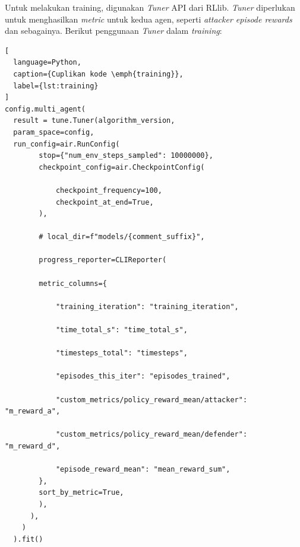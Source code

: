 Untuk melakukan training, digunakan \emph{Tuner} API dari RLlib.
\emph{Tuner} diperlukan untuk menghasilkan \emph{metric} untuk kedua agen,
seperti \emph{attacker episode rewards} dan sebagainya.
Berikut penggunaan \emph{Tuner} dalam \emph{training}:

\begin{lstlisting}[
  language=Python,
  caption={Cuplikan kode \emph{training}},
  label={lst:training}
]
config.multi_agent(
  result = tune.Tuner(algorithm_version,
  param_space=config,
  run_config=air.RunConfig(
        stop={"num_env_steps_sampled": 10000000},
        checkpoint_config=air.CheckpointConfig(

            checkpoint_frequency=100,
            checkpoint_at_end=True,
        ),

        # local_dir=f"models/{comment_suffix}",

        progress_reporter=CLIReporter(

        metric_columns={

            "training_iteration": "training_iteration",

            "time_total_s": "time_total_s",

            "timesteps_total": "timesteps",

            "episodes_this_iter": "episodes_trained",

            "custom_metrics/policy_reward_mean/attacker": "m_reward_a",

            "custom_metrics/policy_reward_mean/defender": "m_reward_d",

            "episode_reward_mean": "mean_reward_sum",
        },
        sort_by_metric=True,
        ),
      ),
    )
  ).fit()

\end{lstlisting}

